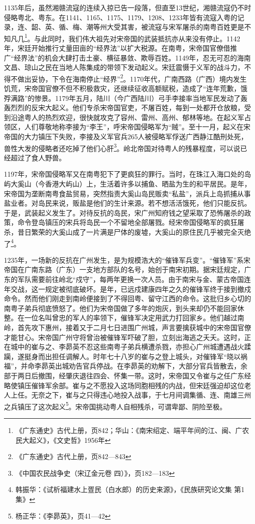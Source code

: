 1135年后，虽然湘赣流寇的连续入掠已告一段落，但直至13世纪，湘赣流寇仍不时侵略粤北、粤东。在1141、1165、1175、1179、1208、1233年皆有流寇入粤的记录，连、韶、英、循、梅、潮等州大受其害，被流寇与宋军屠杀的南粤百姓更是不知凡几\footnote{《广东通史》古代上册，页842；华山：《南宋绍定、端平年间的江、闽、广农民大起义》，《文史哲》1956年}。与此同时，我们伟大祖先对宋帝国的武装抵抗亦从来没有停止。1142年，宋廷开始推行丈量田亩的“经界法”以扩大税源。在南粤，宋帝国官僚借推广“经界法”的机会大肆打击土豪、横征暴敛、欺辱百姓。1149年，忍无可忍的海南文昌、琼山之民在当地人陈集成的带领下发动起义。宋廷震慑于义军的战斗力，不得不做出妥协，下令在海南停止“经界”\footnote{《广东通史》古代上册，页842—843}。1170年代，广南西路（广西）境内发生饥荒，宋帝国官僚不但不积极救灾，还继续征收高额赋税，造成了“连年荒歉，饿殍满路”的惨景。1179年五月，陆川（今广西陆川）弓手李接率当地军民发动了轰轰烈烈的反宋大起义。他们专杀宋帝国官吏，不屠百姓，每到一处都开仓放粮，受到沿途粤人的热烈欢迎，很快就攻克了容州、雷州、高州、郁林等地。在起义军占领区，人们尊敬地称李接为“李王”，呼宋帝国侵略军为“贼”。至十一月，起义在宋帝国的大力镇压下失败，李接及义军官兵265人被侵略军俘送广西静江酷刑处死，兽性大发的侵略者还吃掉了他们心肝\footnote{《中国农民战争史（宋辽金元卷 四）》，页182—183}。岭北帝国对待粤人的残暴程度，可以说已经超过了食人野兽。

1197年，宋帝国侵略军又在南粤犯下了更疯狂的罪行。当时，在珠江入海口处的岛屿大奚山（今香港大屿山）上，生活着许多以捕鱼、晒盐为生的和平居民。是年，宋帝国为垄断南粤食盐贸易，突然指责大奚山岛民贩卖“私盐”，派兵上岛抓捕从事盐业者。对岛民来说，贩盐是他们的生计来源。若不想活活饿死，他们只能反抗。于是，武装起义发生了。对待反抗的岛民，宋广州知府钱之望采取了恐怖屠杀的政策，命令登岛镇压的宋兵将岛民一个不留地全部屠戮。经宋帝国侵略军的疯狂屠杀，昔日繁荣的大奚山成了一片满是尸体的废墟，大奚山的原住民几乎被完全灭绝了\footnote{韩振华：《试析福建水上疍民（白水郎）的历史来源》，《民族研究论文集 第1集》}。

1235年，一场新的反抗在广州发生，是为规模浩大的“催锋军兵变”。“催锋军”系宋帝国在广南东路（广东）一支地方部队的名号，始创于南宋初期。据宋廷规定，广东的军队需要前往岭北“戍守”，每两年更换一次人员。由于南宋与金、蒙古帝国连年交战，这一规定被彻底破坏。是年，已远戍建康四年之久的催锋军终于接到撤戍命令。然而他们刚走到南岭便接到了不得回粤、留守江西的命令。这批归乡心切的南粤子弟兵彻底愤怒了。他们为宋帝国做了多年的炮灰，到头来却仍不能回家休整。在一位名叫曾忠的军人的率领下，催锋军决定用武力打回家乡。他们越过南岭，首先攻下惠州，接着又于二月七日进围广州城，声言要擒获城中的宋帝国官僚才能甘心。宋帝国广州守将曾治被催锋军吓破了胆，立刻出海逃之夭夭。这时，正在城中的崔与之、李昴英不忍这些南粤子弟兵横遭杀戮，亦担心广州城遭遇战火蹂躏，遂挺身而出担任调解人。时年七十八岁的崔与之登上城头，对催锋军“晓以祸福”，并命李昴英出城劝告官兵停战。在李昴英的劝解下，大部分官兵皆散去，余部于两日后撤围，经肇庆退往四会、怀集一带。这时，宋帝国又令崔与之任广东经略使镇压催锋军余部。崔与之不愿投入这场同胞相残的内战，但宋廷强迫却这位老人上任。无奈之下，崔与之只得违心地投入战事，于七月间调集循、连、南雄三州之兵镇压了这次起义\footnote{杨正华：《李昴英》，页41—42}。宋帝国挑动粤人自相残杀，可谓卑鄙、阴险至极。


